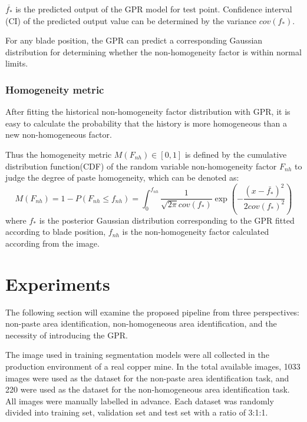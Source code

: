 \documentclass[pdflatex,sn-mathphys]{sn-jnl}%
\theoremstyle{thmstyleone}%
\theoremstyle{thmstyletwo}%
\theoremstyle{thmstylethree}%
\begin{document}
$\overline{f_*}$  is the predicted output of the GPR model for test point. Confidence interval (CI) of the predicted output value can be determined by the variance $cov(f_*)$.
\par

For any blade position, the GPR can predict a corresponding Gaussian distribution for determining whether the non-homogeneity factor is within normal limits.\par



\subsubsection{Homogeneity metric}\label{2.3.2}

 After fitting the historical non-homogeneity factor distribution with GPR, it is easy to calculate the probability that the history is more homogeneous than a new non-homogeneous factor.       
 
Thus the homogeneity metric $M(F_{nh}) \in [0,1]$ is defined by the cumulative distribution function(CDF) of the random variable non-homogeneity factor $F_{nh}$ to judge the degree of paste homogeneity,  which can be denoted as:
\begin{equation}
    M(F_{nh}) =1- P(F_{nh} \leq f_{nh})=\int_{0}^{f_{nh}}\frac{1}{\sqrt{2 \pi} cov(f_*)} \exp \left(-\frac{(x-\bar{f_*} )^{2}}{2  cov(f_*)^{2}}\right)
\end{equation}
where $f_*$ is the posterior Gaussian distribution  corresponding to the GPR fitted according to blade position, $f_{nh}$ is the non-homogeneity factor calculated according from the image.

\section{Experiments}\label{sec5}
The following section will examine the proposed pipeline from three perspectives: 
non-paste area identification, non-homogeneous area identification, and the necessity of introducing the GPR.\par
The image used in training segmentation models were all collected in the production environment of a real copper mine. In the total available images, 1033 images were used as the dataset for the non-paste area identification task, and 220 were used as the dataset for the non-homogeneous area identification task. 
All images were manually labelled in advance. 
Each dataset was randomly divided into training set, validation set and test set with a ratio of 3:1:1.         
\end{document}
